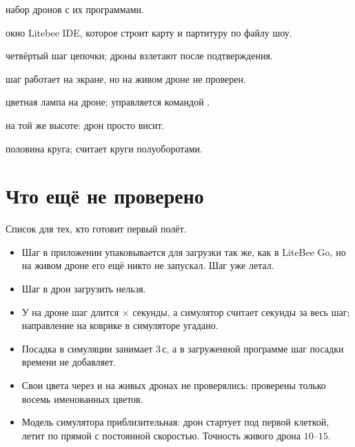 \begin{description}[style=nextline, leftmargin=1.2em, itemsep=4pt]
  \item[Шоу] набор дронов с их программами.
  \item[Симулятор] окно Litebee IDE, которое строит карту и партитуру по файлу шоу.
  \item[Старт] четвёртый шаг цепочки; дроны взлетают после подтверждения.
  \item[Статус «только симулятор»] шаг работает на экране, но на живом дроне не проверен.
  \item[Светодиод] цветная лампа на дроне; управляется командой .
  \item[Ожидание]  на той же высоте: дрон просто висит.
  \item[Полуоборот] половина круга;  считает круги полуоборотами.
\end{description}

\chapter{Что ещё не проверено}\label{app:unverified}

Список для тех, кто готовит первый полёт.

\begin{itemize}
  \item Шаг  в приложении упаковывается для загрузки так же, как в LiteBee Go, но на живом дроне его ещё никто не запускал. Шаг  уже летал.
  \item Шаг  в дрон загрузить нельзя.
  \item У  на дроне шаг длится  $\times$ секунды, а симулятор считает секунды за весь шаг; направление  на коврике в симуляторе угадано.
  \item Посадка в симуляции занимает 3\,с, а в загруженной программе шаг посадки времени не добавляет.
  \item Свои цвета через  и  на живых дронах не проверялись: проверены только восемь именованных цветов.
  \item Модель симулятора приблизительная: дрон стартует под первой клеткой, летит по прямой с постоянной скоростью. Точность живого дрона $10$–$15$\cm.
\end{itemize}

